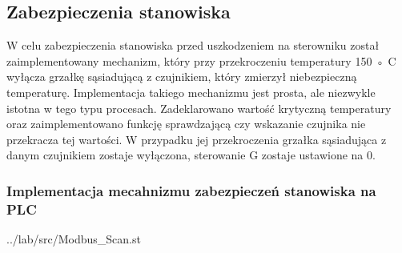 \subsection{Zabezpieczenia stanowiska}
\label{lab:zad2}

W	celu	zabezpieczenia	stanowiska	przed	uszkodzeniem	na	sterowniku	został	
zaimplementowany	mechanizm,	który	przy	przekroczeniu	temperatury	150	◦
C	
wyłącza	grzałkę	sąsiadującą	z	czujnikiem,	który	zmierzył	niebezpieczną	
temperaturę.	Implementacja	takiego	mechanizmu	jest	prosta,	ale	niezwykle	
istotna	w	tego	typu	procesach.	Zadeklarowano	wartość	krytyczną	temperatury	
oraz	zaimplementowano	funkcję	sprawdzającą	czy	wskazanie	czujnika	nie	
przekracza	tej	wartości. W	przypadku	jej	przekroczenia	grzałka	sąsiadująca	z	
danym	czujnikiem	zostaje	wyłączona,	sterowanie	G	zostaje	ustawione	na	0.

\subsubsection{Implementacja mecahnizmu zabezpieczeń stanowiska na PLC}

\ifdefined\CompileListings
    
        {../lab/src/Modbus_Scan.st}
    \newpage
\fi


\newpage
